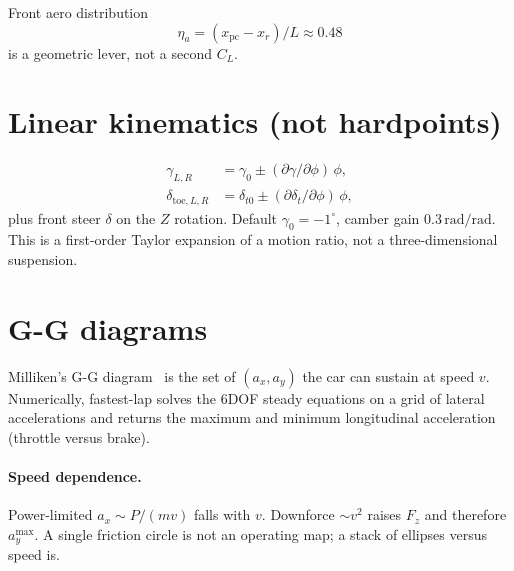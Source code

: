 \documentclass[11pt,letterpaper]{article}
\begin{document}
Front aero distribution
\[
  \eta_a = (x_{\mathrm{pc}}-x_r)/L \approx 0.48
\]
is a geometric lever, not a second $C_L$.

\section{Linear kinematics (not hardpoints)}
\label{sec:kin}

\begin{align}
  \gamma_{L,R} &= \gamma_0 \pm (\partial\gamma/\partial\phi)\,\phi,\\
  \delta_{\mathrm{toe},L,R} &= \delta_{t0} \pm (\partial\delta_t/\partial\phi)\,\phi,
\end{align}
plus front steer $\delta$ on the $Z$ rotation. Default $\gamma_0=-1^\circ$,
camber gain $0.3\,\mathrm{rad/rad}$. This is a first-order Taylor
expansion of a motion ratio, not a three-dimensional suspension.

\section{G-G diagrams}
\label{sec:gg}

Milliken's G-G diagram~\cite{milliken} is the set of $(a_x,a_y)$ the car
can sustain at speed $v$. Numerically, fastest-lap solves the 6DOF
steady equations on a grid of lateral accelerations and returns the
maximum and minimum longitudinal acceleration (throttle versus brake).

\paragraph{Speed dependence.}
Power-limited $a_x \sim P/(m v)$ falls with $v$. Downforce $\sim v^2$
raises $F_z$ and therefore $a_y^{\max}$. A single friction circle is
not an operating map; a stack of ellipses versus speed is.
\end{document}
